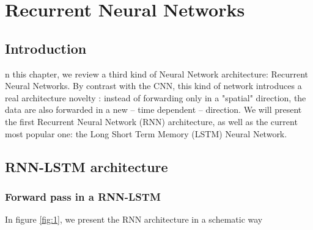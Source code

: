 \chapter{Recurrent Neural Networks} \label{sec:chapterRNN}

\minitoc

\section{Introduction}

n this chapter, we review a third kind of Neural Network architecture: Recurrent Neural Networks\cite{GravesA2016}. By contrast with the CNN, this kind of network introduces a real architecture novelty : instead of forwarding only in a "spatial" direction, the data are also forwarded in a new -- time dependent -- direction. We will present the first Recurrent Neural Network (RNN) architecture, as well as the current most popular one: the Long Short Term Memory (LSTM) Neural Network.

\section{RNN-LSTM architecture}

\subsection{Forward pass in a RNN-LSTM}

In figure \ref{fig:1}, we present the RNN architecture in a schematic way

